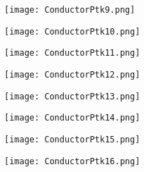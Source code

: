\documentclass[pdf]{beamer}
\begin{document}
\begin{frame}
\begin{figure}[!h]
\centering
\texttt{[image: ConductorPtk9.png]}
\end{figure}
\end{frame}

\begin{frame}
\begin{figure}[!h]
\centering
\texttt{[image: ConductorPtk10.png]}
\end{figure}
\end{frame}

\begin{frame}
\begin{figure}[!h]
\centering
\texttt{[image: ConductorPtk11.png]}
\end{figure}
\end{frame}

\begin{frame}
\begin{figure}[!h]
\centering
\texttt{[image: ConductorPtk12.png]}
\end{figure}
\end{frame}

\begin{frame}
\begin{figure}[!h]
\centering
\texttt{[image: ConductorPtk13.png]}
\end{figure}
\end{frame}

\begin{frame}
\begin{figure}[!h]
\centering
\texttt{[image: ConductorPtk14.png]}
\end{figure}
\end{frame}

\begin{frame}
\begin{figure}[!h]
\centering
\texttt{[image: ConductorPtk15.png]}
\end{figure}
\end{frame}

\begin{frame}
\begin{figure}[!h]
\centering
\texttt{[image: ConductorPtk16.png]}
\end{figure}
\end{frame}
\end{document}

